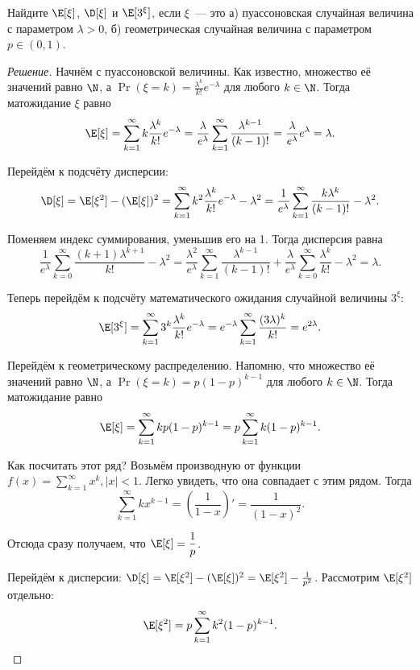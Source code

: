 \begin{problem}
    Найдите \(\E[\xi]\), \(\D[\xi]\) и \(\E[3^{\xi}]\), если \(\xi\)~--- это а) пуассоновская случайная величина с параметром \(\lambda > 0\), б) геометрическая случайная величина с параметром \(p \in (0, 1)\).
\end{problem}
\begin{proof}[Решение]
    Начнём с пуассоновской величины. Как известно, множество её значений равно \(\N\), а \(\Pr(\xi = k) = \frac{\lambda^k}{k!}e^{-\lambda}\) для любого \(k \in \N\). Тогда матожидание \(\xi\) равно
    \[\E[\xi] = \sum_{k = 1}^{\infty} k\frac{\lambda^k}{k!}e^{-\lambda} = \frac{\lambda}{e^{\lambda}} \sum_{k = 1}^{\infty} \frac{\lambda^{k - 1}}{(k - 1)!} = \frac{\lambda}{e^{\lambda}}e^{\lambda} = \lambda.\]
    
    Перейдём к подсчёту дисперсии:
    \[\D[\xi] = \E[\xi^2] - (\E[\xi])^2 = \sum_{k = 1}^{\infty} k^2\frac{\lambda^k}{k!}e^{-\lambda} - \lambda^2 = \frac{1}{e^{\lambda}}\sum_{k = 1}^{\infty} \frac{k\lambda^k}{(k - 1)!} - \lambda^2.\]
    
    Поменяем индекс суммирования, уменьшив его на 1. Тогда дисперсия равна
    \[\frac{1}{e^{\lambda}}\sum_{k = 0}^{\infty} \frac{(k + 1)\lambda^{k + 1}}{k!} - \lambda^2 = \frac{\lambda^2}{e^{\lambda}}\sum_{k = 1}^{\infty} \frac{\lambda^{k - 1}}{(k - 1)!} + \frac{\lambda}{e^{\lambda}}\sum_{k = 0}^{\infty} \frac{\lambda^{k}}{k!} - \lambda^2 = \lambda.\]
    
    Теперь перейдём к подсчёту математического ожидания случайной величины \(3^{\xi}\):
    \[\E[3^{\xi}] = \sum_{k = 1}^{\infty} 3^k\frac{\lambda^k}{k!}e^{-\lambda} = e^{-\lambda}\sum_{k = 1}^{\infty}\frac{(3\lambda)^k}{k!} = e^{2\lambda}.\]
    
    Перейдём к геометрическому распределению. Напомню, что множество её значений равно \(\N\), а \(\Pr(\xi = k) = p(1 - p)^{k - 1}\) для любого \(k \in \N\). Тогда матожидание равно
    \[\E[\xi] = \sum_{k = 1}^{\infty} kp(1 - p)^{k - 1} = p\sum_{k = 1}^{\infty} k(1 - p)^{k - 1}.\]
    
    Как посчитать этот ряд? Возьмём производную от функции \(f(x) = \sum\limits_{k = 1}^{\infty} x^{k}, |x| < 1\). Легко увидеть, что она совпадает с этим рядом. Тогда
    \[\sum_{k = 1}^{\infty} kx^{k - 1} = \left(\frac{1}{1 - x}\right)' = \frac{1}{(1 - x)^2}.\]
    
    Отсюда сразу получаем, что \(\E[\xi] = \dfrac{1}{p}\).
    
    Перейдём к дисперсии: \(\D[\xi] = \E[\xi^2] - (\E[\xi])^2 = \E[\xi^2] - \frac{1}{p^2}\). Рассмотрим \(\E[\xi^2]\) отдельно:
    \[\E[\xi^2] = p\sum_{k = 1}^{\infty} k^2(1 - p)^{k - 1}.\]
    

\end{proof}
